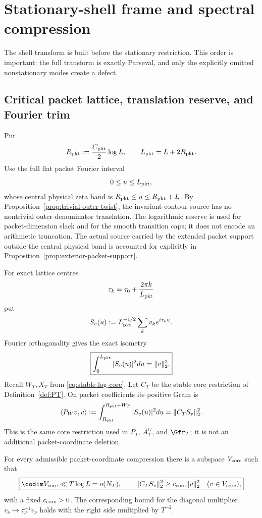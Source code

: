 \section{Stationary-shell frame and spectral compression}
\label{sec:shell-frame}

The shell transform is built before the stationary restriction. This order is
important: the full transform is exactly Parseval, and only the explicitly
omitted nonstationary modes create a defect.

\subsection{Critical packet lattice, translation reserve, and Fourier trim}
Put
\[
R_{\rm pkt}:=\frac{C_{\rm pkt}}2\log L,
\qquad
L_{\rm pkt}=L+2R_{\rm pkt}.
\]
Use the full flat packet Fourier interval
\[
0\le u\le L_{\rm pkt},
\]
whose central physical zeta band is
$R_{\rm pkt}\le u\le R_{\rm pkt}+L$. By Proposition~\ref{prop:trivial-outer-twist}, the invariant contour source has
no nontrivial outer-denominator translation. The logarithmic reserve is used
for packet-dimension slack and for the smooth transition caps; it does not
encode an arithmetic truncation.  The actual source carried by the extended
packet support outside the central physical band is accounted for explicitly
in Proposition~\ref{prop:exterior-packet-support}.

For exact lattice centres
\[
\tau_k=\tau_0+\frac{2\pi k}{L_{\rm pkt}}
\]
put
\begin{equation}
S_v(u):=L_{\rm pkt}^{-1/2}\sum_kv_ke^{i\tau_ku}.
\label{eq:lattice-synthesis-shell}
\end{equation}
Fourier orthogonality gives the exact isometry
\begin{equation}
\boxed{
\int_0^{L_{\rm pkt}}|S_v(u)|^2du=\|v\|_2^2.
}
\label{eq:lattice-synthesis-isometry}
\end{equation}
Recall $W_T,X_T$ from \eqref{eq:stable-log-core}. Let $C_T$ be the stable-core
restriction of Definition~\ref{def:PT}. On packet coefficients its positive
Gram is
\[
\langle P_Wv,v\rangle
:=\int_{R_{\rm pkt}}^{R_{\rm pkt}+W_T}|S_v(u)|^2du
=\|C_T S_v\|_2^2.
\]
This is the same core restriction used in $P_T$, $A_T^G$, and $\Gfr_T$; it is
not an additional packet-coordinate deletion.

\begin{lemma}
\label{lem:stable-core-frame}
For every admissible packet-coordinate compression there is a subspace
$V_{\rm core}$ such that
\begin{equation}
\boxed{
\codim V_{\rm core}\ll T\log L=o(N_T),
\qquad
\|C_TS_v\|_2^2\ge c_{\rm core}\|v\|_2^2
\quad(v\in V_{\rm core}),
}
\label{eq:stable-core-frame}
\end{equation}
with a fixed $c_{\rm core}>0$. The corresponding bound for the diagonal
multiplier $v_\nu\mapsto\tau_\nu^{-1}v_\nu$ holds with the right side multiplied
by $T^{-2}$.
\end{lemma}

